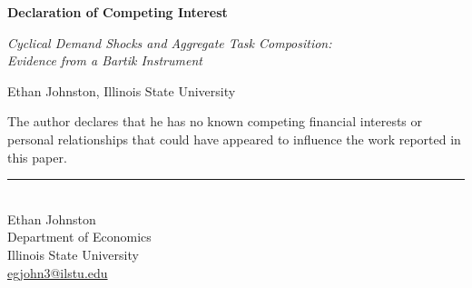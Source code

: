 \documentclass[11pt]{article}
\begin{document}
\thispagestyle{empty}

\begin{center}
    {\Large\bfseries Declaration of Competing Interest\par}

    \vspace{0.5em}

    {\large \textit{Cyclical Demand Shocks and Aggregate Task Composition:\\
                    Evidence from a Bartik Instrument}\par}

    \vspace{0.5em}

    Ethan Johnston, Illinois State University
\end{center}

\vspace{2em}

\noindent
The author declares that he has no known competing financial interests or
personal relationships that could have appeared to influence the work
reported in this paper.

\vspace{3em}

\noindent\rule{2.5in}{0.4pt}\\
Ethan Johnston\\
Department of Economics\\
Illinois State University\\
\href{mailto:egjohn3@ilstu.edu}{egjohn3@ilstu.edu}
\end{document}
